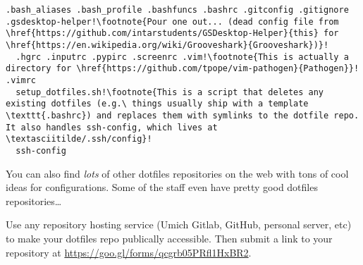 \documentclass{article}
\begin{document}
\begin{lstlisting}[escapechar=!]
  .bash_aliases .bash_profile .bashfuncs .bashrc .gitconfig .gitignore .gsdesktop-helper!\footnote{Pour one out... (dead config file from \href{https://github.com/intarstudents/GSDesktop-Helper}{this} for \href{https://en.wikipedia.org/wiki/Grooveshark}{Grooveshark})}!
  .hgrc .inputrc .pypirc .screenrc .vim!\footnote{This is actually a directory for \href{https://github.com/tpope/vim-pathogen}{Pathogen}}!  .vimrc
  setup_dotfiles.sh!\footnote{This is a script that deletes any existing dotfiles (e.g.\ things usually ship with a template \texttt{.bashrc}) and replaces them with symlinks to the dotfile repo. It also handles ssh-config, which lives at \textasciitilde/.ssh/config}!
  ssh-config
\end{lstlisting}

You can also find \emph{lots} of other dotfiles repositories on the web with
tons of cool ideas for configurations. Some of the staff even have pretty good
dotfiles repositories\dots

Use any repository hosting service (Umich Gitlab, GitHub, personal server,
etc) to make your dotfiles repo publically accessible. Then submit a link to
your repository at
\href{https://goo.gl/forms/qcgrb05PRfl1HxBR2}{https://goo.gl/forms/qcgrb05PRfl1HxBR2}.
\end{document}
